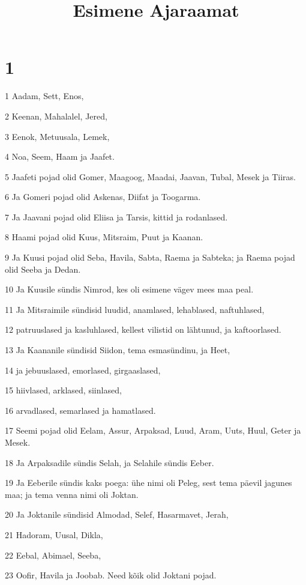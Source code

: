 

\title{Esimene Ajaraamat}

\chapter{1}

\par 1 Aadam, Sett, Enos,
\par 2 Keenan, Mahalalel, Jered,
\par 3 Eenok, Metuusala, Lemek,
\par 4 Noa, Seem, Haam ja Jaafet.
\par 5 Jaafeti pojad olid Gomer, Maagoog, Maadai, Jaavan, Tubal, Mesek ja Tiiras.
\par 6 Ja Gomeri pojad olid Askenas, Diifat ja Toogarma.
\par 7 Ja Jaavani pojad olid Eliisa ja Tarsis, kittid ja rodanlased.
\par 8 Haami pojad olid Kuus, Mitsraim, Puut ja Kaanan.
\par 9 Ja Kuusi pojad olid Seba, Havila, Sabta, Raema ja Sabteka; ja Raema pojad olid Seeba ja Dedan.
\par 10 Ja Kuusile sündis Nimrod, kes oli esimene vägev mees maa peal.
\par 11 Ja Mitsraimile sündisid luudid, anamlased, lehablased, naftuhlased,
\par 12 patruuslased ja kasluhlased, kellest vilistid on lähtunud, ja kaftoorlased.
\par 13 Ja Kaananile sündisid Siidon, tema esmasündinu, ja Heet,
\par 14 ja jebuuslased, emorlased, girgaaslased,
\par 15 hiivlased, arklased, siinlased,
\par 16 arvadlased, semarlased ja hamatlased.
\par 17 Seemi pojad olid Eelam, Assur, Arpaksad, Luud, Aram, Uuts, Huul, Geter ja Mesek.
\par 18 Ja Arpaksadile sündis Selah, ja Selahile sündis Eeber.
\par 19 Ja Eeberile sündis kaks poega: ühe nimi oli Peleg, sest tema päevil jagunes maa; ja tema venna nimi oli Joktan.
\par 20 Ja Joktanile sündisid Almodad, Selef, Hasarmavet, Jerah,
\par 21 Hadoram, Uusal, Dikla,
\par 22 Eebal, Abimael, Seeba,
\par 23 Oofir, Havila ja Joobab. Need kõik olid Joktani pojad.
